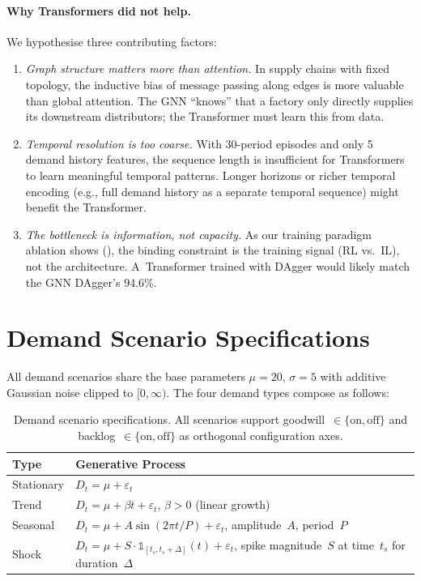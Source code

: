\paragraph{Why Transformers did not help.}
We hypothesise three contributing factors:
\begin{enumerate}
  \item \emph{Graph structure matters more than attention.} In supply chains
        with fixed topology, the inductive bias of message passing along
        edges is more valuable than global attention. The GNN ``knows''
        that a factory only directly supplies its downstream distributors;
        the Transformer must learn this from data.
  \item \emph{Temporal resolution is too coarse.} With 30-period episodes
        and only 5 demand history features, the sequence length is
        insufficient for Transformers to learn meaningful temporal patterns.
        Longer horizons or richer temporal encoding (e.g., full demand
        history as a separate temporal sequence) might benefit the
        Transformer.
  \item \emph{The bottleneck is information, not capacity.} As our
        training paradigm ablation shows (),
        the binding constraint is the training signal (RL vs.\ IL), not
        the architecture. A~Transformer trained with DAgger would likely
        match the GNN DAgger's 94.6\%.
\end{enumerate}


\section{Demand Scenario Specifications}\label{app:demand}

All demand scenarios share the base parameters $\mu = 20$,
$\sigma = 5$ with additive Gaussian noise clipped to $[0, \infty)$.
The four demand types compose as follows:

\begin{table}[htbp]
\centering
\caption{Demand scenario specifications. All scenarios support
goodwill~$\in \{\text{on}, \text{off}\}$ and backlog~$\in \{\text{on},
\text{off}\}$ as orthogonal configuration axes.}
\label{tab:demand_specs}
\small
\begin{tabular}{lp{8.5cm}}
\toprule
\textbf{Type} & \textbf{Generative Process} \\
\midrule
Stationary & $D_t = \mu + \varepsilon_t$ \\
Trend      & $D_t = \mu + \beta t + \varepsilon_t$, \quad $\beta > 0$ (linear growth) \\
Seasonal   & $D_t = \mu + A \sin(2\pi t / P) + \varepsilon_t$, \quad amplitude~$A$, period~$P$ \\
Shock      & $D_t = \mu + S \cdot \mathbb{1}_{[t_s, t_s+\Delta]}(t) + \varepsilon_t$,
             \quad spike magnitude~$S$ at time~$t_s$ for duration~$\Delta$ \\
\bottomrule
\end{tabular}
\end{table}


